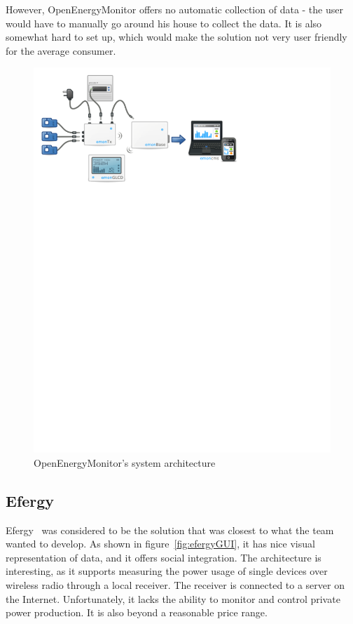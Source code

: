 However, OpenEnergyMonitor offers no automatic collection of data - the user would have to manually go around his house to collect the data. It is also somewhat hard to set up, which would make the solution not very user friendly for the average consumer. 

\setcounter{figure}{1}
\begin{figure}[H]
\centering
\includegraphics[width=\textwidth, trim=0.5cm 19cm 6.5cm 0cm, clip]{ch/prestudy/fig/OEM_system.pdf}
\caption{OpenEnergyMonitor's system architecture}
\label{fig:oem}
\end{figure}


\newpage

\subsection{Efergy}

Efergy~\cite{efergy} was considered to be the solution that was closest to what the team wanted to develop. As shown in figure~\ref{fig:efergyGUI}, it has nice visual representation of data, and it offers social integration. The architecture is interesting, as it supports measuring the power usage of single devices over wireless radio through a local receiver. The receiver is connected to a server on the Internet. Unfortunately, it lacks the ability to monitor and control private power production. It is also beyond a reasonable price range.


